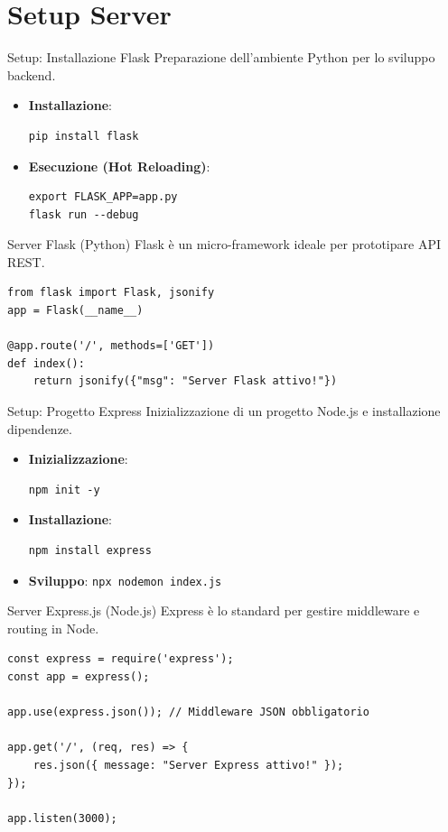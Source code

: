 \documentclass[10pt]{beamer}
\begin{document}
\section{Setup Server}
\begin{frame}[fragile]{Setup: Installazione Flask}
    Preparazione dell'ambiente Python per lo sviluppo backend.
    \begin{itemize}
        \item \textbf{Installazione}:
        \begin{verbatim}
pip install flask
        \end{verbatim}
        \item \textbf{Esecuzione (Hot Reloading)}:
        \begin{verbatim}
export FLASK_APP=app.py
flask run --debug
        \end{verbatim}
    \end{itemize}
\end{frame}

\begin{frame}[fragile]{Server Flask (Python)}
    Flask è un micro-framework ideale per prototipare API REST.
    \begin{verbatim}
from flask import Flask, jsonify
app = Flask(__name__)

@app.route('/', methods=['GET'])
def index():
    return jsonify({"msg": "Server Flask attivo!"})
    \end{verbatim}
\end{frame}

\begin{frame}[fragile]{Setup: Progetto Express}
    Inizializzazione di un progetto Node.js e installazione dipendenze.
    \begin{itemize}
        \item \textbf{Inizializzazione}:
        \begin{verbatim}
npm init -y
        \end{verbatim}
        \item \textbf{Installazione}:
        \begin{verbatim}
npm install express
        \end{verbatim}
        \item \textbf{Sviluppo}: \texttt{npx nodemon index.js}
    \end{itemize}
\end{frame}

\begin{frame}[fragile]{Server Express.js (Node.js)}
    Express è lo standard per gestire middleware e routing in Node.
    \begin{verbatim}
const express = require('express');
const app = express();

app.use(express.json()); // Middleware JSON obbligatorio

app.get('/', (req, res) => {
    res.json({ message: "Server Express attivo!" });
});

app.listen(3000);
    \end{verbatim}
\end{frame}
\end{document}
